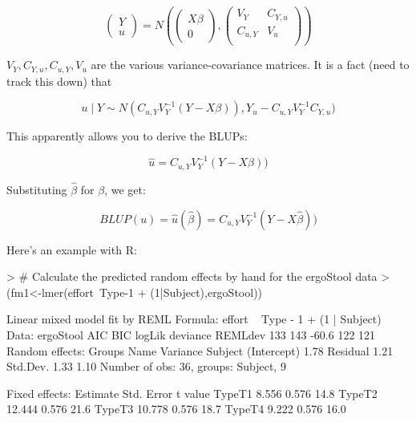 \documentclass[10pt,landscape]{article}
\begin{document}
\begin{multicols}{3}
\begin{equation}
\begin{pmatrix}
Y \\
u
\end{pmatrix}
= 
N\left(
\begin{pmatrix}
X\beta\\
0
\end{pmatrix},
\begin{pmatrix}
V_Y & C_{Y,u}\\
C_{u,Y} & V_u \\
\end{pmatrix}
\right)
\end{equation}

$V_Y, C_{Y,u}, C_{u,Y}, V_u$ are the various variance-covariance matrices. 
It is a fact (need to track this down) that

\begin{equation}
u\mid Y \sim N(C_{u,Y}V_Y^{-1}(Y-X\beta)), 
Y_u - C_{u,Y} V_Y^{-1} C_{Y,u})
\end{equation}

This apparently allows you to derive the BLUPs:

\begin{equation}
\hat{u}= C_{u,Y}V_Y^{-1}(Y-X\beta))
\end{equation}

Substituting $\hat{\beta}$ for $\beta$, we get:

\begin{equation}
BLUP(u)= \hat{u}(\hat{\beta})=C_{u,Y}V_Y^{-1}(Y-X\hat{\beta}))
\end{equation}

Here's an example with R:

\begin{Schunk}
\begin{Sinput}
> # Calculate the predicted random effects by hand for the ergoStool data
> (fm1<-lmer(effort~Type-1 + (1|Subject),ergoStool))
\end{Sinput}
\begin{Soutput}
Linear mixed model fit by REML 
Formula: effort ~ Type - 1 + (1 | Subject) 
   Data: ergoStool 
 AIC BIC logLik deviance REMLdev
 133 143  -60.6      122     121
Random effects:
 Groups   Name        Variance
 Subject  (Intercept) 1.78    
 Residual             1.21    
 Std.Dev.
 1.33    
 1.10    
Number of obs: 36, groups: Subject, 9

Fixed effects:
       Estimate Std. Error t value
TypeT1    8.556      0.576    14.8
TypeT2   12.444      0.576    21.6
TypeT3   10.778      0.576    18.7
TypeT4    9.222      0.576    16.0


\end{Soutput}
\end{Schunk}
\end{multicols}
\end{document}
